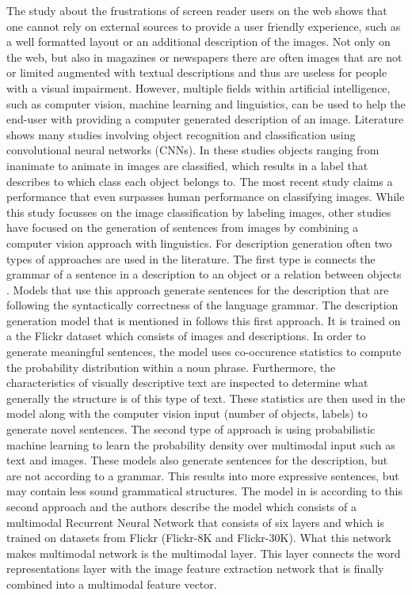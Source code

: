 The study about the frustrations of screen reader users on the web shows that one cannot rely on external sources to provide a user friendly experience, such as a well formatted layout or an additional description of the images. Not only on the web, but also in magazines or newspapers there are often images that are not or limited augmented with textual descriptions and thus are useless for people with a visual impairment. However, multiple fields within artificial intelligence, such as computer vision, machine learning and linguistics, can be used to help the end-user with providing a computer generated description of an image. Literature shows many studies involving object recognition and classification \cite{carbonetto2004statistical, he2015delving} using convolutional neural networks (CNNs). In these studies objects ranging from inanimate to animate in images are classified, which results in a label that describes to which class each object belongs to. The most recent study \cite{he2015delving} claims a performance that even surpasses human performance on classifying images. 
While this study focusses on the image classification by labeling images, other studies \cite{mao2014explain, mitchell2012midge, Yang2011, Farhadi2010} have focused on the generation of sentences from images by combining a computer vision approach with linguistics. For description generation often two types of approaches are used in the literature. The first type is connects the grammar of a sentence in a description to an object or a relation between objects \cite{karpathy2014deep}. Models that use this approach generate sentences for the description that are following the syntactically correctness of the language grammar. The description generation model that is mentioned in \cite{mitchell2012midge} follows this first approach. It is trained on a the Flickr dataset which consists of images and descriptions. In order to generate meaningful sentences, the model uses co-occurence statistics to compute the probability distribution within a noun phrase. Furthermore, the characteristics of visually descriptive text are inspected to determine what generally the structure is of this type of text. These statistics are then used in the model along with the computer vision input (number of objects, labels) to generate novel sentences.
The second type of approach is using probabilistic machine learning to learn the probability density over multimodal input such as text and images. These models also generate sentences for the description, but are not according to a grammar. This results into more expressive sentences, but may contain less sound grammatical structures. The model in \cite{mao2014explain} is according to this second approach and the authors describe the model which consists of a multimodal Recurrent Neural Network that consists of six layers and which is trained on datasets from Flickr (Flickr-8K and Flickr-30K). What this network makes multimodal network is the multimodal layer. This layer connects the word representations layer with the image feature extraction network that is finally combined into a multimodal feature vector. 

